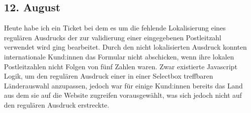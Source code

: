 \subsection{12. August}
Heute habe ich ein Ticket bei dem es um die fehlende Lokalisierung eines regulären Ausdrucks der zur validierung einer eingegebenen Postleitzahl verwendet wird ging bearbeitet. Durch den nicht lokalisierten Ausdruck konnten internationale Kund:innen das Formular nicht abschicken, wenn ihre lokalen Postleitzahlen nicht Folgen von fünf Zahlen waren. Zwar existierte Javascript Logik, um den regulären Ausdruck einer in einer Selectbox treffbaren Länderauswahl anzupassen, jedoch war für einige Kund:innen bereits das Land aus dem sie auf die Website zugreifen vorausgewählt, was sich jedoch nicht auf den regulären Ausdruck erstreckte.